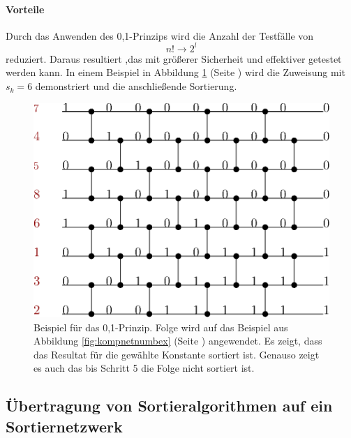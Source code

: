 \documentclass[11pt]{article}
\begin{document}
\paragraph{Vorteile} Durch das Anwenden des 0,1-Prinzips wird die Anzahl der Testfälle von 
\begin{equation}
n! \rightarrow 2^l
\label{eq:fallred}
\end{equation} 
reduziert. Daraus resultiert ,das mit größerer Sicherheit und effektiver getestet werden kann.
\FloatBarrier
In einem Beispiel in Abbildung \ref{fig:01ex} (Seite \pageref{fig:01ex}) wird die Zuweisung mit $s_k = 6$ demonstriert und die anschließende Sortierung. 
\begin{figure}
\begin{center}
\includegraphics[scale=0.75]{01beispiel.eps}
\end{center}
\caption{Beispiel für das 0,1-Prinzip. Folge wird auf das Beispiel aus Abbildung \ref{fig:kompnetnumbex} (Seite \pageref{fig:kompnetnumbex}) angewendet. Es zeigt, dass das Resultat für die gewählte Konstante sortiert ist. Genauso zeigt es auch das bis Schritt 5 die Folge nicht sortiert ist.}
\label{fig:01ex}
\end{figure}
\subsection{Übertragung von Sortieralgorithmen auf ein Sortiernetzwerk}
\end{document}
